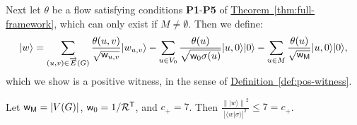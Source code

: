 \documentclass{article}
\newcommand{\thm}[1]{\hyperref[thm:#1]{Theorem~\ref*{thm:#1}}}
\newcommand{\defin}[1]{\hyperref[def:#1]{Definition~\ref*{def:#1}}}
\def\ket#1{{\lvert}#1\rangle}
\renewcommand{\>}{\rangle}
\newcommand{\<}{\langle}
\renewcommand{\(}{\left(}
\renewcommand{\)}{\right)}
\def\braket#1#2{{{\langle}#1\vert}#2\rangle}
\def\norm#1{\left\| #1 \right\|}
\def\w{{\sf w}}
\begin{document}
Next let $\theta$ be a flow satisfying conditions \textbf{P1}-\textbf{P5} of \thm{full-framework}, which can only exist if $M\neq\emptyset$. Then
we define:
\begin{equation}
\ket{w}=\sum_{(u,v)\in \overrightarrow{E}(G)}\frac{\theta(u,v)}{\sqrt{\w_{u,v}}}\ket{w_{u,v}}-\sum_{u\in V_0}\frac{\theta(u)}{\sqrt{\w_0\sigma(u)}}\ket{u,0}\ket{0}-\sum_{u\in M}\frac{\theta(u)}{\sqrt{\w_{\sf M}}}\ket{u,0}\ket{0},\label{eq:full-fwk-w}
\end{equation}
which we show is a positive witness, in the sense of \defin{pos-witness}. 


\begin{lemma}\label{lem:full-fwk-pos-1}
Let $\w_{\sf M}=|V(G)|$, $\w_0=1/{\cal R}^{\sf T}$, and $c_+=7$. Then $\displaystyle \frac{\norm{\ket{w}}^2}{|\braket{w}{\sigma}|^2}  \leq 7 = c_+$.
\end{lemma}
\end{document}
